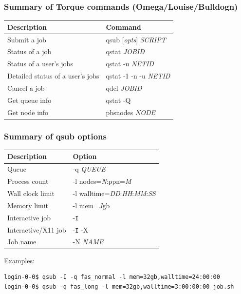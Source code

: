 \documentclass[10pt]{beamer}
\begin{document}
\begin{frame}
\frametitle{Summary of Torque commands (Omega/Louise/Bulldogn)}
\begin{tabular}{|l|l|}
\hline
\textbf{Description} & \textbf{Command} \\
\hline
Submit a job & qsub [\textit{opts}] \textit{SCRIPT} \\
\hline
Status of a job & qstat \textit{JOBID} \\
\hline
Status of a user's jobs & qstat -u \textit{NETID} \\
\hline
Detailed status of a user's jobs & qstat -1 -n -u \textit{NETID} \\
\hline
Cancel a job & qdel \textit{JOBID} \\
\hline
Get queue info & qstat -Q \\
\hline
Get node info & pbsnodes \textit{NODE} \\
\hline
\end{tabular}
\end{frame}

\begin{frame}[fragile]
\frametitle{Summary of qsub options}
\begin{tabular}{|l|l|}
\hline
\textbf{Description} & \textbf{Option} \\
\hline
Queue & -q \textit{QUEUE} \\
\hline
Process count & -l nodes=\textit{N}:ppn=\textit{M} \\
\hline
Wall clock limit & -l walltime=\textit{DD}:\textit{HH}:\textit{MM}:\textit{SS} \\
\hline
Memory limit & -l mem=\textit{J}gb \\
\hline
Interactive job & -\texttt{I} \\
\hline
Interactive/X11 job & -\texttt{I} -X \\
\hline
Job name & -N \textit{NAME} \\
\hline
\end{tabular}

\vskip10pt
Examples:
\begin{verbatim}
login-0-0$ qsub -I -q fas_normal -l mem=32gb,walltime=24:00:00
login-0-0$ qsub -q fas_long -l mem=32gb,walltime=3:00:00:00 job.sh
\end{verbatim}
\end{frame}
\end{document}

